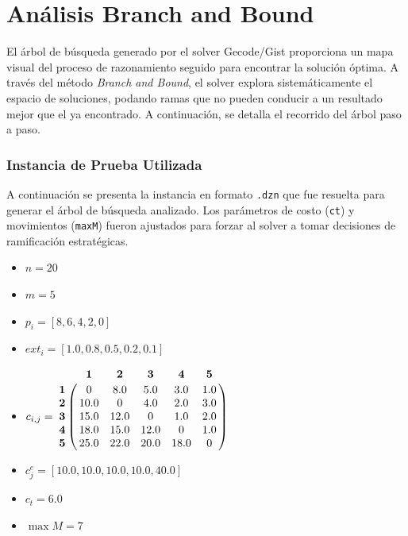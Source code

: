 \documentclass[11pt,letter]{article}
\begin{document}
\section{Análisis Branch and Bound}

El árbol de búsqueda generado por el solver Gecode/Gist proporciona un mapa visual del proceso de razonamiento seguido para encontrar la solución óptima. A través del método \textit{Branch and Bound}, el solver explora sistemáticamente el espacio de soluciones, podando ramas que no pueden conducir a un resultado mejor que el ya encontrado. A continuación, se detalla el recorrido del árbol paso a paso.

\subsubsection*{Instancia de Prueba Utilizada}
A continuación se presenta la instancia en formato \texttt{.dzn} que fue resuelta para generar el árbol de búsqueda analizado. Los parámetros de costo (\texttt{ct}) y movimientos (\texttt{maxM}) fueron ajustados para forzar al solver a tomar decisiones de ramificación estratégicas.

\begin{itemize}
    \item $n = 20$
    \item $m = 5$
    \item $p_i = [8, 6, 4, 2, 0]$
    \item $\mathit{ext}_i = [1.0, 0.8, 0.5, 0.2, 0.1]$
    \item $c_{i,j} = \bordermatrix{
              & \mathbf{1} & \mathbf{2} & \mathbf{3} & \mathbf{4} & \mathbf{5} \cr
        \mathbf{1} & 0   & 8.0 & 5.0 & 3.0 & 1.0 \cr
        \mathbf{2} & 10.0& 0   & 4.0 & 2.0 & 3.0 \cr
        \mathbf{3} & 15.0& 12.0& 0   & 1.0 & 2.0 \cr
        \mathbf{4} & 18.0& 15.0& 12.0& 0   & 1.0 \cr
        \mathbf{5} & 25.0& 22.0& 20.0& 18.0& 0 \cr
    }$
    \item $c^e_j = [10.0, 10.0, 10.0, 10.0, 40.0]$
    \item $c_t = 6.0$
    \item $\max M = 7$
\end{itemize}
\end{document}
